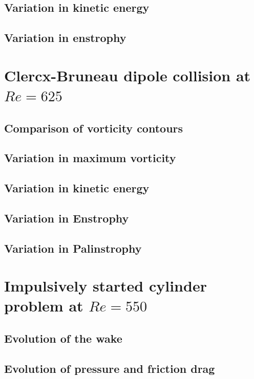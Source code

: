 	\subsection{Variation in kinetic energy}
	
	\subsection{Variation in enstrophy}

\section{Clercx-Bruneau dipole collision at $Re=625$}

	\subsection{Comparison of vorticity contours}
	
	\subsection{Variation in maximum vorticity}
	
	\subsection{Variation in kinetic energy}
	
	\subsection{Variation in Enstrophy}
	
	\subsection{Variation in Palinstrophy}

\section{Impulsively started cylinder problem at $Re=550$}

	\subsection{Evolution of the wake}
	
	\subsection{Evolution of pressure and friction drag}
	
